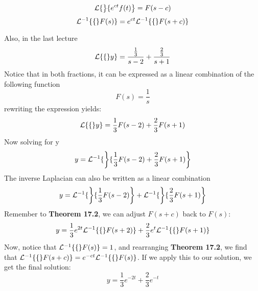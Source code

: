 \documentclass[diffeq.tex]{subfiles}
\begin{document}
    \begin{theorem}
        \begin{equation}
            \mathcal{L}\{\left\}\{e^{ct}f(t)\right\} = F(s - c)
        \end{equation}
        \begin{equation}
            \mathcal{L}^{-1}\{\{\}F(s)\} = e^{ct}\mathcal{L}^{-1}\{\{\}F(s + c)\}
        \end{equation}
    \end{theorem}\np
    Also, in the last lecture
    \begin{equation}
        \mathcal{L}\{\{\}y\} = \frac{\frac{1}{3}}{s - 2} + \frac{\frac{2}{3}}{s + 1}
    \end{equation}
    Notice that in both fractions, it can be expressed as a linear combination of the following function
    \begin{equation}
        F(s) = \frac{1}{s}
    \end{equation}
    rewriting the expression yields:
    \begin{equation}
        \mathcal{L}\{\{\}y\} = \frac{1}{3}F(s - 2) + \frac{2}{3}F(s + 1)
    \end{equation}
    Now solving for y
    \begin{equation}
        y = \mathcal{L}^{-1}\{\left\}\{\frac{1}{3}F(s - 2) + \frac{2}{3}F(s + 1)\right\}
    \end{equation}
    The inverse Laplacian can also be written as a linear combination
    \begin{equation}
        y = \mathcal{L}^{-1}\{\left\}\{\frac{1}{3}F(s - 2)\right\} + \mathcal{L}^{-1}\{\left\}\{\frac{2}{3}F(s + 1)\right\}
    \end{equation}
    Remember to \textbf{Theorem 17.2}, we can adjust $F(s + c)$ back to $F(s)$:
    \begin{equation}
        y = \frac{1}{3}e^{2t}\mathcal{L}^{-1}\{\{\}F(s + 2)\} + \frac{2}{3}e^{t}\mathcal{L}^{-1}\{\{\}F(s + 1)\}
    \end{equation}
    Now, notice that $\mathcal{L}^{-1}\{\{\}F(s)\} = 1$, and rearranging \textbf{Theorem 17.2}, we find that $\mathcal{L}^{-1}\{\{\}F(s + c)\} = e^{-ct}\mathcal{L}^{-1}\{\{\}F(s)\}$. If we apply this to our solution, we get the final solution:
    \begin{equation}
        y = \frac{1}{3}e^{-2t}+\frac{2}{3}e^{-t}
    \end{equation}
\end{document}

